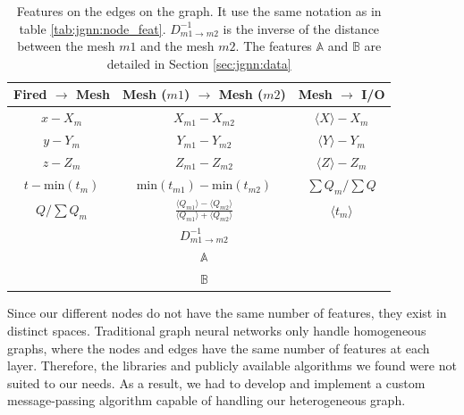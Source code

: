 \documentclass[../main.tex]{subfiles}
\begin{document}
\begin{table}
  \centering
  \begin{tabular}{|c|c|c|}
    \hline
    Fired $\rightarrow$ Mesh & Mesh ($m1$) $\rightarrow$ Mesh ($m2$) & Mesh $\rightarrow$ I/O \\
    \hline \hline
    $x - X_m$ & $X_{m1} - X_{m2}$ & $\langle X \rangle - X_m$ \\
    $y - Y_m$ & $Y_{m1} - Y_{m2}$ & $\langle Y \rangle - Y_m$ \\
    $z - Z_m$ & $Z_{m1} - Z_{m2}$ & $\langle Z \rangle - Z_m$ \\
    $t - \mathrm{min}(t_m)$ & $\mathrm{min}(t_{m1}) - \mathrm{min}(t_{m2})$ & $\sum Q_m / \sum Q$ \\
    $Q / \sum Q_m$ & $\frac{\langle Q_{m1} \rangle - \langle Q_{m2} \rangle}{\langle Q_{m1} \rangle + \langle Q_{m2} \rangle}$ & $\langle t_m \rangle$ \\
     & $D^{-1}_{m1 \rightarrow m2}$ & \\
     & $\mathbb{A}$ & \\
     & $\mathbb{B}$ & \\
    \hline
  \end{tabular}
  \caption{Features on the edges on the graph. It use the same notation as in table \ref{tab:jgnn:node_feat}. $D^{-1}_{m1 \rightarrow m2}$ is the inverse of the distance between the mesh $m1$ and the mesh $m2$. The features $\mathbb{A}$ and $\mathbb{B}$ are detailed in Section \ref{sec:jgnn:data}}
  \label{tab:jgnn:edge_feat}

\end{table}

Since our different nodes do not have the same number of features, they exist in distinct spaces. Traditional graph neural networks only handle homogeneous graphs, where the nodes and edges have the same number of features at each layer. Therefore, the libraries and publicly available algorithms we found were not suited to our needs. As a result, we had to develop and implement a custom message-passing algorithm capable of handling our heterogeneous graph.
\end{document}
